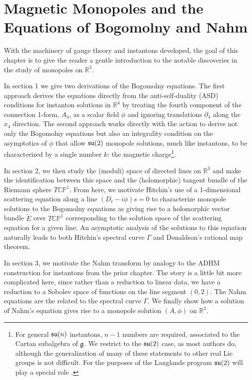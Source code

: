 \chapter{Magnetic Monopoles and the Equations of Bogomolny and Nahm\label{ch:monopoles}}
	
	With the machinery of gauge theory and instantons developed, the goal of this chapter is to give the reader a gentle introduction to the notable discoveries in the study of monopoles on $\mathbb R^3$.
	
	In section 1 we give two derivations of the Bogomolny equations. The first approach derives the equations directly from the anti-self-duality (ASD) conditions for instanton solutions in $\mathbb R^4$ by treating the fourth component of the connection 1-form, $A_4$, as a scalar field $\phi$ and ignoring translations $\partial_4$ along the $x_4$ direction. The second approach works directly with the action to derive not only the Bogomolny equations but also an integrality condition on the asymptotics of $\phi$ that allow $\frak{su}(2)$ monopole solutions, much like instantons, to be characterized by a single number $k$: the magnetic charge\footnote{For general $\frak{su}(n)$ instantons, $n-1$ numbers are required, associated to the Cartan subalgebra of $\frak{g}$. We restrict to the $\frak{su}(2)$ case, as most authors do, although the generalization of many of these statements to other real Lie groups is not difficult. For the purposes of the Langlands program $\frak{su}(2)$ will play a special role \cite{witten2010}.}.
	
	In section 2, we then study the (moduli) space of directed lines on $\mathbb R^3$ and make the identification between this space and the (holomorphic) tangent bundle of the Riemann sphere $T \mathbb{CP}^1$. From here, we motivate Hitchin's use of a 1-dimensional scattering equation along a line $(D_{t} - i \phi)s = 0$ to characterize monopole solutions to the Bogomolny equations as giving rise to a holomorphic vector bundle $\tilde E$ over $T\mathbb{CP}^1$ corresponding to the solution space of the scattering equation for a given line. An asymptotic analysis of the solutions to this equation naturally leads to both Hitchin's spectral curve $\Gamma$ and Donaldson's rational map theorem.
	
	In section 3, we motivate the Nahm transform by analogy to the ADHM construction for instantons from the prior chapter. The story is a little bit more complicated here, since rather than a reduction to linear data, we have a reduction to a Sobolev space of functions on the line segment $(0, 2)$. The Nahm equations are the related to the spectral curve $\Gamma$. We finally show how a solution of Nahm's equation gives rise to a monopole solution $(A, \phi)$ on $\mathbb R^3$.
		
